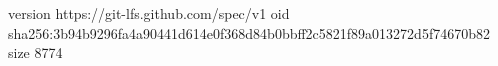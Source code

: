 version https://git-lfs.github.com/spec/v1
oid sha256:3b94b9296fa4a90441d614e0f368d84b0bbff2c5821f89a013272d5f74670b82
size 8774
